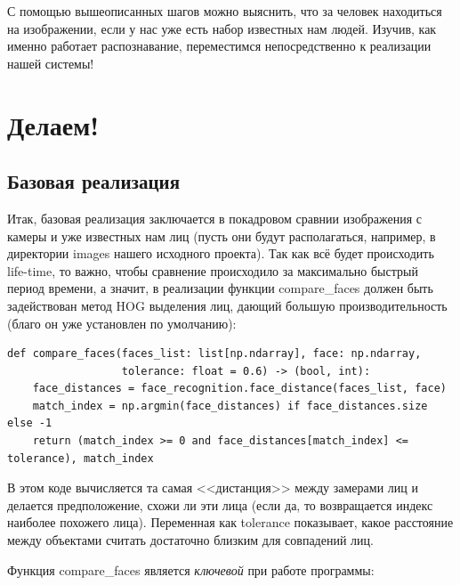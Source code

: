 \documentclass[a4paper,hidelinks,14pt]{extarticle}
\begin{document}
	С помощью вышеописанных шагов можно выяснить, что за человек находиться на изображении, если у нас уже есть набор известных нам людей. Изучив, как именно работает распознавание, переместимся непосредственно к реализации нашей системы!
	
	\section{Делаем!}
	\subsection{Базовая реализация}
	Итак, базовая реализация заключается в покадровом сравнии изображения с камеры и уже известных нам лиц (пусть они будут располагаться, например, в директории images нашего исходного проекта). Так как всё будет происходить life-time, то важно, чтобы сравнение происходило за максимально быстрый период времени, а значит, в реализации функции compare\_faces должен быть задействован метод HOG выделения лиц, дающий большую производительность (благо он уже установлен по умолчанию):
	\begin{verbatim}
def compare_faces(faces_list: list[np.ndarray], face: np.ndarray, 
				  tolerance: float = 0.6) -> (bool, int):
	face_distances = face_recognition.face_distance(faces_list, face)
	match_index = np.argmin(face_distances) if face_distances.size else -1
	return (match_index >= 0 and face_distances[match_index] <= tolerance), match_index
	\end{verbatim}
	
	В этом коде вычисляется та самая <<дистанция>> между замерами лиц и делается предположение, схожи ли эти лица (если да, то возвращается индекс наиболее похожего лица). Переменная как tolerance показывает, какое расстояние между объектами считать достаточно близким для совпадений лиц.
	
	Функция compare\_faces является \textit{ключевой} при работе программы:
	
\end{document}

